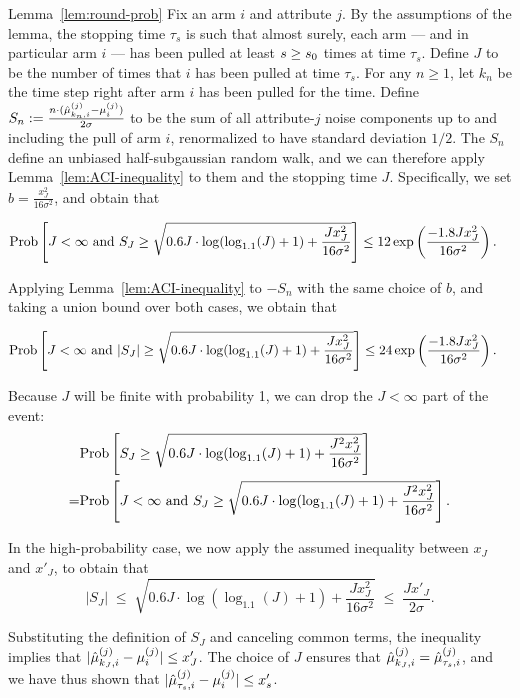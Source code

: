 \begin{extraproof}{Lemma~\ref{lem:round-prob}}
Fix an arm $i$ and attribute $j$.
By the assumptions of the lemma,
the stopping time $\tau_s$ is such that almost surely,
each arm --- and in particular arm $i$ --- has been pulled at least
$s \geq s_0$ times at time $\tau_s$.
Define $J$ to be the number of times that $i$ has been pulled at
time $\tau_s$.
For any $n \geq 1$, let $k_n$ be the time step right after arm $i$ has
been pulled for the  time. Define
$S_n := \frac{n \cdot (\hat{\mu}_{k_n,i}^{(j)} - \mu_{i}^{(j)})}{2 \sigma}$
to be the sum of all attribute-$j$ noise components up to and
including the  pull of arm $i$,
renormalized to have standard deviation $1/2$.
The $S_n$ define an unbiased half-subgaussian random walk,
and we can therefore apply Lemma~\ref{lem:ACI-inequality} to them and
the stopping time $J$.
Specifically, we set $b = \frac{x_J^2}{16 \sigma^2}$,
and obtain that

\begin{align*}
\Prob{J < \infty \mbox{ and } S_J \geq 
\sqrt{0.6 J \cdot \log (\log_{1.1}(J) + 1) + \frac{J x_J^2}{16 \sigma^2}}}
& \leq 12 \exp \left( \frac{-1.8 J x_J^2}{16 \sigma^2} \right).
\end{align*}

Applying Lemma~\ref{lem:ACI-inequality} to $-S_n$ with the same choice
of $b$, and taking a union bound over both cases, we obtain that

\begin{align*}
\Prob{J < \infty \mbox{ and } |S_J| \geq 
\sqrt{0.6 J \cdot \log (\log_{1.1}(J) + 1) + \frac{J x_J^2}{16 \sigma^2}}}
& \leq 24 \exp \left( \frac{-1.8 J x_J^2}{16 \sigma^2} \right).
\end{align*}

Because $J$ will be finite with probability 1, we can drop the
$J < \infty$ part of the event:
\begin{align*}
& \Prob{S_J \geq 
\sqrt{0.6 J \cdot \log (\log_{1.1}(J) + 1) + \frac{J^2 x_J^2}{16
    \sigma^2}}}\\
= & \Prob{J < \infty \mbox{ and } S_J \geq 
\sqrt{0.6 J \cdot \log (\log_{1.1}(J) + 1) + \frac{J^2 x_J^2}{16
    \sigma^2}}}.
\end{align*}

In the high-probability case, we now apply the assumed inequality
between $x_J$ and $x'_J$, to obtain that
\[
|S_J| \; \leq \;
\sqrt{0.6 J \cdot \log (\log_{1.1}(J) + 1) + \frac{J x_J^2}{16 \sigma^2}}
\; \leq \; \frac{J x'_J}{2 \sigma}.
\]

Substituting the definition of $S_J$ and canceling common terms,
the inequality implies that
$|\hat{\mu}_{k_J,i}^{(j)} - \mu_{i}^{(j)}| \leq x'_J$.
The choice of $J$ ensures that
$\hat{\mu}_{k_J,i}^{(j)} = \hat{\mu}_{\tau_s,i}^{(j)}$,
and we have thus shown that
$|\hat{\mu}_{\tau_s,i}^{(j)} - \mu_{i}^{(j)}| \leq x'_s$.
\end{extraproof}




